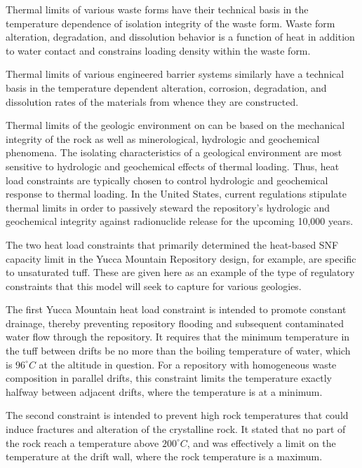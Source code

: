 Thermal limits of various waste forms have their technical basis in the 
temperature dependence of isolation integrity of the waste form. Waste form 
alteration, degradation, and dissolution behavior is a function of heat in 
addition to water contact and constrains loading density within the waste form. 
 
Thermal limits of various engineered barrier systems similarly have a technical 
basis in the temperature dependent alteration, corrosion, degradation, and 
dissolution rates of the materials from whence they are constructed.  

Thermal limits of the geologic environment on can be based on the mechanical 
integrity of the rock as well as minerological, hydrologic and geochemical 
phenomena. The isolating characteristics of a geological environment are most 
sensitive to hydrologic 
and geochemical effects of thermal loading. Thus, heat load constraints are 
typically chosen to control hydrologic and geochemical response to thermal 
loading. In the United States, current regulations stipulate thermal limits in 
order to passively steward the repository's hydrologic and geochemical integrity 
against radionuclide  release for the upcoming 10,000 years.

The two heat load constraints that primarily determined the heat-based SNF 
capacity limit in the Yucca Mountain Repository design, for example, are 
specific to unsaturated tuff. These are given here as an example of the type of 
regulatory constraints that this model will seek to capture for various 
geologies. 

The first Yucca Mountain heat load constraint is intended to promote constant 
drainage, thereby preventing repository flooding and subsequent contaminated 
water flow through the repository. It requires that the minimum temperature in 
the tuff between drifts be no  more than the boiling temperature of water, which 
is $96^{\circ}C$ at the altitude in question. For a repository with homogeneous 
waste composition in parallel drifts, this constraint limits the temperature 
exactly halfway between adjacent drifts, where the temperature is at a minimum.

The second constraint is intended to prevent high rock temperatures that could 
induce fractures and alteration of the crystalline rock. It stated that no part 
of the rock reach a temperature above $200^{\circ}C$, and was effectively a 
limit on the temperature at the drift wall, where the rock temperature is a 
maximum.  

